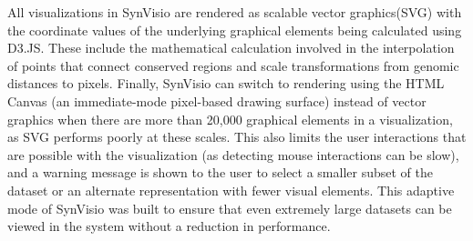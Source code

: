 All visualizations in SynVisio are rendered as scalable vector graphics(SVG) with the coordinate values of the underlying graphical elements being calculated using D3.JS. These include the mathematical calculation involved in the interpolation of points that connect conserved regions and scale transformations from genomic distances to pixels. Finally, SynVisio can switch to rendering using the HTML Canvas (an immediate-mode pixel-based drawing surface) instead of vector graphics when there are more than 20,000 graphical elements in a visualization, as SVG performs poorly at these scales. This also limits the user interactions that are possible with the visualization (as detecting mouse interactions can be slow), and a warning message is shown to the user to select a smaller subset of the dataset or an alternate representation with fewer visual elements. This adaptive mode of SynVisio was built to ensure that even extremely large datasets can be viewed in the system without a reduction in performance.

